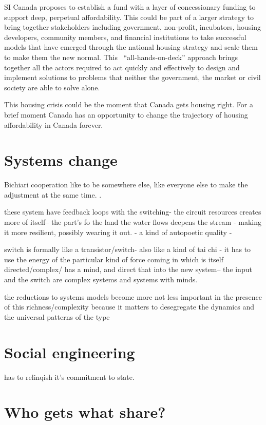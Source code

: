 SI Canada proposes to establish a fund with a layer of concessionary funding to support deep, perpetual affordability. This could be part of a larger strategy to bring together stakeholders including government, non-profit, incubators, housing developers, community members, and financial institutions to take successful models that have emerged through the national housing strategy and scale them to make them the new normal. This  “all-hands-on-deck” approach brings together all the actors required to act quickly and effectively to design and implement solutions to problems that neither the government, the market or civil society are able to solve alone.  

This housing crisis could be the moment that Canada gets housing right. For a brief moment Canada has an opportunity to change the trajectory of housing affordability in Canada forever.


\section{Systems change}


Bichiari cooperation
like to be somewhere else, like everyone else to make the adjustment at the same time. .

these system have feedback loops with the switching- the circuit resources creates more of itself-- the part's fo the land the water flows deepens the stream - making it more resilient, possibly wearing it out. - a kind of autopoetic quality -

switch is formally like a transistor/switch- also like a kind of tai chi - it has to use the energy of the particular kind of force coming in which is itself directed/complex/ has a mind, and direct that into the new system-- the input and the switch are complex systems and systems with minds.


the reductions to systems models become more not less important in the presence of this richness/complexity because it matters to desegregate the dynamics and the universal patterns of the type


\section{Social engineering}

has to relinqish it's commitment to state. 


\section{Who gets what share?}

